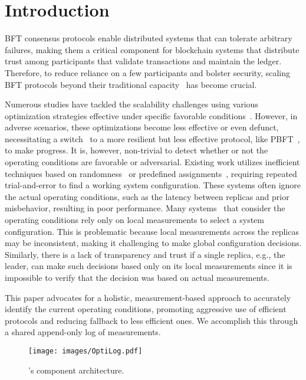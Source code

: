 \section{Introduction}

\ac{BFT} consensus protocols enable distributed systems that can tolerate arbitrary failures, making them a critical component for blockchain systems that distribute trust among participants that validate transactions and maintain the ledger.
Therefore, to reduce reliance on a few participants and bolster security, scaling BFT protocols beyond their traditional capacity~\cite{pbft, zyzzyva} has become crucial.

Numerous studies have tackled the scalability challenges using various optimization strategies effective under specific favorable conditions~\cite{sbft, algorand, tendermint, kauri, mirbft}.
However, in adverse scenarios, these optimizations become less effective or even defunct, necessitating a switch~\cite{Abstract, adapt} to a more resilient but less effective protocol, like PBFT~\cite{pbft}, to make progress.
It is, however, non-trivial to detect whether or not the operating conditions are favorable or adversarial.
Existing work utilizes inefficient techniques based on randomness~\cite{algorand, kauri, mytumbler} or predefined assignments~\cite{mirbft}, requiring repeated trial-and-error to find a working system configuration.
These systems often ignore the actual operating conditions, such as the latency between replicas and prior misbehavior, resulting in poor performance.
Many systems~\cite{bft-smart,local1,local2,local3,local4} that consider the operating conditions rely only on local measurements to select a system configuration.
This is problematic because local measurements across the replicas may be inconsistent, making it challenging to make global configuration decisions.
Similarly, there is a lack of transparency and trust if a single replica, e.g., the leader, can make such decisions based only on its local measurements since it is impossible to verify that the decision was based on actual measurements.

This paper advocates for a holistic, measurement-based approach to accurately identify the current operating conditions, promoting aggressive use of efficient protocols and reducing fallback to less efficient ones.
We accomplish this through a shared append-only log of measurements.

\begin{figure}[t]
  \centering
  \texttt{[image: images/OptiLog.pdf]}
  \caption{\sysname's component architecture.}
  \label{fig:arch}
\end{figure}


